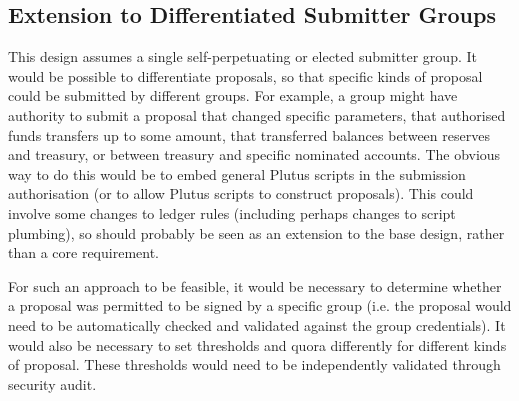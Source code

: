 \subsection{Extension to Differentiated Submitter Groups}

This design assumes a single self-perpetuating or elected submitter group.  It
would be possible to differentiate proposals, so that specific kinds of proposal
could be submitted by different groups.  For example, a group might have
authority to submit a proposal that changed specific parameters, that authorised
funds transfers up to some amount, that transferred balances between reserves
and treasury, or between treasury and specific nominated accounts.  The obvious
way to do this would be to embed general Plutus scripts in the submission
authorisation (or to allow Plutus scripts to construct proposals).  This could
involve some changes to ledger rules (including perhaps changes to script
plumbing), so should probably be seen as an extension to the base design, rather
than a core requirement.  

For such an approach to be feasible, it would be necessary to determine whether
a proposal was permitted to be signed by a specific group (i.e. the proposal
would need to be automatically checked and validated against the group
credentials).  It would also be necessary to set thresholds and quora
differently for different kinds of proposal.  These thresholds would need to be
independently validated through security audit.
